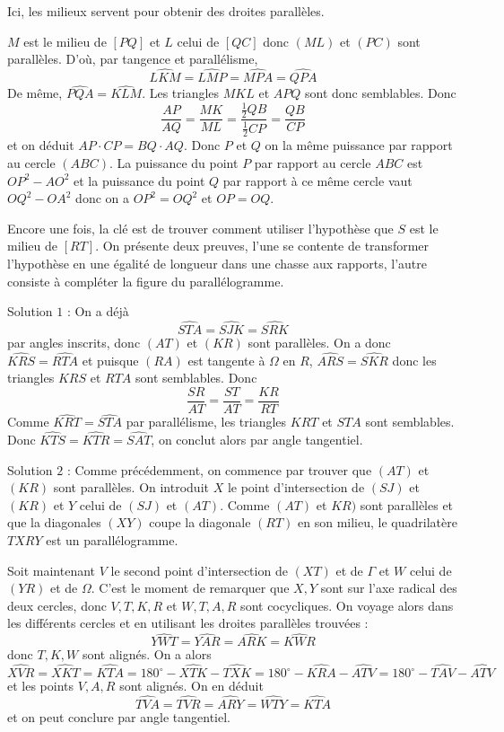 \begin{sol}
Ici, les milieux servent pour obtenir des droites parallèles.

$M$ est le milieu de $[PQ]$ et $L$ celui de $[QC]$ donc $(ML)$ et $(PC)$ sont parallèles. D'où, par tangence et parallélisme,
$$\widehat{LKM} = \widehat{LMP} = \widehat{MPA} = \widehat{QPA}$$
De même, $\widehat{PQA} = \widehat{KLM}$. Les triangles $MKL$ et $APQ$ sont donc semblables. Donc
$$\frac{AP}{AQ} = \frac{MK}{ML} = \frac{\frac 12QB}{\frac 12CP} = \frac{QB}{CP}$$
et on déduit $AP\cdot CP = BQ\cdot AQ$. Donc $P$ et $Q$ on la même puissance par rapport au cercle $(ABC)$. La puissance du point $P$ par rapport au cercle $ABC$ est $OP^2 - AO^2$ et la puissance du point $Q$ par rapport à ce même cercle vaut $OQ^2 - OA^2$ donc on a $OP^2 = OQ^2$ et $OP = OQ$.
\end{sol}


\begin{sol}
Encore une fois, la clé est de trouver comment utiliser l'hypothèse que $S$ est le milieu de $[RT]$. On présente deux preuves, l'une se contente de transformer l'hypothèse en une égalité de longueur dans une chasse aux rapports, l'autre consiste à compléter la figure du parallélogramme.

Solution $1$ : On a déjà
$$\widehat{STA} = \widehat{SJK} = \widehat{SRK}$$ par angles inscrits, donc $(AT)$ et $(KR)$ sont parallèles.
On a donc $\widehat{KRS} = \widehat{RTA}$ et puisque $(RA)$ est tangente à $\Omega$ en $R$, $\widehat{ARS}=\widehat{SKR}$ donc les triangles $KRS$ et $RTA$ sont semblables.
Donc
$$\frac{SR}{AT} = \frac{ST}{AT} = \frac{KR}{RT}$$
Comme $\widehat{KRT} = \widehat{STA}$ par parallélisme, les triangles $KRT$ et $STA$ sont semblables. Donc $\widehat{KTS} = \widehat{KTR} = \widehat{SAT}$, on conclut alors par angle tangentiel.


Solution $2$ : Comme précédemment, on commence par trouver que $(AT)$ et $(KR)$ sont parallèles. On introduit $X$ le point d'intersection de $(SJ)$ et $(KR)$ et $Y$ celui de $(SJ)$ et $(AT)$. Comme $(AT)$ et $KR)$ sont parallèles et que la diagonales $(XY)$ coupe la diagonale $(RT)$ en son milieu, le quadrilatère $TXRY$ est un parallélogramme.

Soit maintenant $V$ le second point d'intersection de $(XT)$ et de $\Gamma$ et $W$ celui de $(YR)$ et de $\Omega$. C'est le moment de remarquer que $X,Y$ sont sur l'axe radical des deux cercles, donc $V,T,K,R$ et $W,T,A,R$ sont cocycliques. On voyage alors dans les différents cercles et en utilisant les droites parallèles trouvées :
$$\widehat{YWT}=\widehat{YAR}=\widehat{ARK}=\widehat{KWR}$$
donc $T,K,W$ sont alignés. On a alors
$$\widehat{XVR} = \widehat{XKT}=\widehat{KTA}= 180^\circ - \widehat{XTK}-\widehat{TXK} = 180^\circ - \widehat{KRA} - \widehat{ATV} = 180^\circ - \widehat{TAV} - \widehat{ATV}$$
et les points $V,A,R$ sont alignés.
On en déduit
$$\widehat{TVA}=\widehat{TVR}=\widehat{ARY}=\widehat{WTY}=\widehat{KTA}$$ et on peut conclure par angle tangentiel.
\end{sol}


